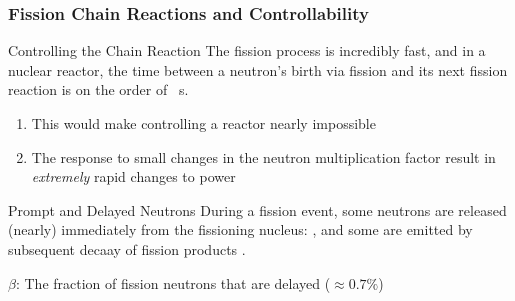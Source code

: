 \documentclass[10pt,compress]{beamer}
\begin{document}
\begin{frame}\frametitle{Fission Chain Reactions and Controllability}
    \begin{block}{Controlling the Chain Reaction}
        The fission process is incredibly fast, and in a nuclear reactor, the time between a neutron's birth via fission and its next fission reaction is
        on the order of \si{\mu s}.
        \begin{enumerate}
            \item This would make controlling a reactor nearly impossible
            \item The response to small changes in the neutron multiplication factor result in \emph{extremely} rapid changes to power
        \end{enumerate}
    \end{block}
    \begin{block}{Prompt and Delayed Neutrons}
        During a fission event, some neutrons are released (nearly) immediately from the fissioning nucleus: , and some are emitted by subsequent decaay of
        fission products .
        \begin{flushleft}
        $\beta$: The fraction of fission neutrons that are delayed ($\approx 0.7\%$)
        \end{flushleft}
    \end{block}
\end{frame}
\end{document}
